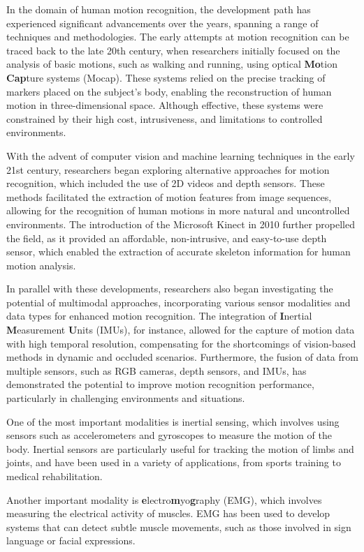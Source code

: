 \documentclass[12pt, a4paper]{article}
\begin{document}
In the domain of human motion recognition, the development path has experienced significant advancements over the years, spanning a range of techniques and methodologies. The early attempts at motion recognition can be traced back to the late 20th century, when researchers initially focused on the analysis of basic motions, such as walking and running, using optical \textbf{Mo}tion \textbf{Cap}ture systems (Mocap). These systems relied on the precise tracking of markers placed on the subject's body, enabling the reconstruction of human motion in three-dimensional space. Although effective, these systems were constrained by their high cost, intrusiveness, and limitations to controlled environments.

With the advent of computer vision and machine learning techniques in the early 21st century, researchers began exploring alternative approaches for motion recognition, which included the use of 2D videos and depth sensors. These methods facilitated the extraction of motion features from image sequences, allowing for the recognition of human motions in more natural and uncontrolled environments. The introduction of the Microsoft Kinect in 2010 further propelled the field, as it provided an affordable, non-intrusive, and easy-to-use depth sensor, which enabled the extraction of accurate skeleton information for human motion analysis.

In parallel with these developments, researchers also began investigating the potential of multimodal approaches, incorporating various sensor modalities and data types for enhanced motion recognition. The integration of \textbf{I}nertial \textbf{M}easurement \textbf{U}nits (IMUs), for instance, allowed for the capture of motion data with high temporal resolution, compensating for the shortcomings of vision-based methods in dynamic and occluded scenarios. Furthermore, the fusion of data from multiple sensors, such as RGB cameras, depth sensors, and IMUs, has demonstrated the potential to improve motion recognition performance, particularly in challenging environments and situations.

One of the most important modalities is inertial sensing, which involves using sensors such as accelerometers and gyroscopes to measure the motion of the body. Inertial sensors are particularly useful for tracking the motion of limbs and joints, and have been used in a variety of applications, from sports training to medical rehabilitation.

Another important modality is \textbf{e}lectro\textbf{m}yo\textbf{g}raphy (EMG), which involves measuring the electrical activity of muscles. EMG has been used to develop systems that can detect subtle muscle movements, such as those involved in sign language or facial expressions.
\end{document}
